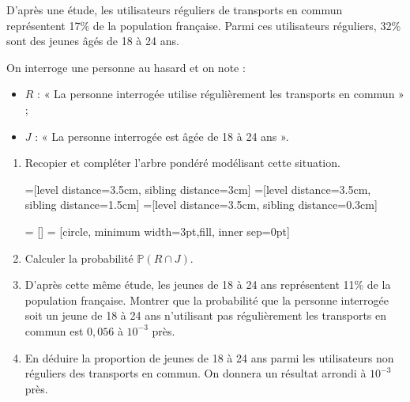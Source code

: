 \documentclass[11pt,fleqn, openany]{book} %
\begin{document}
\begin{exercise}[subtitle={(Centres étrangers 2021)}]

D'après une étude, les utilisateurs réguliers de transports en commun représentent 17\% de la population française. Parmi ces utilisateurs réguliers, 32\% sont des jeunes âgés  de 18 à 24 ans.

On interroge une personne au hasard et on note :
\begin{itemize}
\item $R$ : « La personne interrogée utilise régulièrement les transports en commun » ;
\item $J$ : « La personne interrogée est âgée de 18 à 24 ans ».
\end{itemize}

\begin{enumerate}
\item Recopier et compléter l'arbre pondéré modélisant cette situation.


=[level distance=3.5cm, sibling distance=3cm]
=[level distance=3.5cm, sibling distance=1.5cm]
=[level distance=3.5cm, sibling distance=0.3cm]

 = []
 = [circle, minimum width=3pt,fill, inner sep=0pt]


\begin{center}
\end{center}

\item Calculer la probabilité $\mathbb{P}(R \cap J)$.
\item D'après cette même étude, les jeunes de 18 à 24 ans représentent 11\% de la
population française. Montrer que la probabilité que la personne interrogée soit un jeune de 18 à 24 ans n'utilisant pas régulièrement les transports en commun est $0,056$ à $10^{-3}$ près.
\item En déduire la proportion de jeunes de 18 à 24 ans parmi les utilisateurs non
réguliers des transports en commun. On donnera un résultat arrondi à $10^{-3}$ près.

\newpage
\end{enumerate}\end{exercise}
\end{document}
